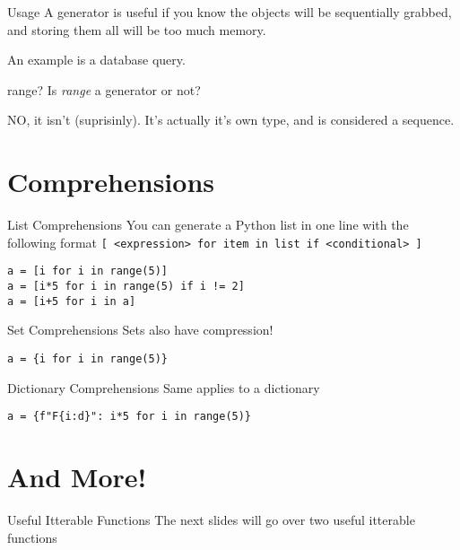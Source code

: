 \documentclass[10pt]{beamer}
\begin{document}
\begin{frame}{Usage}
  A generator is useful if you know the objects will be sequentially grabbed, and storing them all will be too much memory.

  An example is a database query.
\end{frame}

\begin{frame}{range?}
  Is \textit{range} a generator or not?\pause

  NO, it isn't (suprisinly). It's actually it's own type, and is considered a sequence.
\end{frame}

\section{Comprehensions}
\begin{frame}[containsverbatim]{List Comprehensions}
  You can generate a Python list in one line with the following format \verb|[ <expression> for item in list if <conditional> ]|

  \begin{verbatim}
a = [i for i in range(5)]
a = [i*5 for i in range(5) if i != 2]
a = [i+5 for i in a]
  \end{verbatim}
\end{frame}

\begin{frame}[containsverbatim]{Set Comprehensions}
  Sets also have compression!

\begin{verbatim}
a = {i for i in range(5)}
\end{verbatim}
\end{frame}

\begin{frame}[containsverbatim]{Dictionary Comprehensions}
  Same applies to a dictionary

\begin{verbatim}
a = {f"F{i:d}": i*5 for i in range(5)}
\end{verbatim}
\end{frame}

\section{And More!}

\begin{frame}{Useful Itterable Functions}
  The next slides will go over two useful itterable functions
\end{frame}
\end{document}
